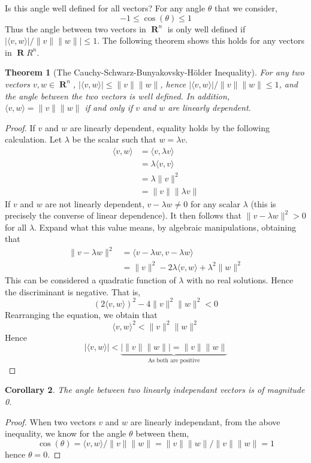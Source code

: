 \documentclass{report}
\newtheorem{theorem}{Theorem}[chapter]
\newtheorem{corollary}[theorem]{Corollary}
\DeclareMathOperator{\real}{\mathbf{R}}
\begin{document}
Is this angle well defined for all vectors? For any angle $\theta$ that we consider,
%
\[ -1 \leq \cos(\theta) \leq 1 \]
%
Thus the angle between two vectors in $\real^n$ is only well defined if $|\langle v, w \rangle|/\|v\|\|w\|| \leq 1$. The following theorem shows this holds for any vectors in $\real{R}^n$.

\begin{theorem}[The Cauchy-Schwarz-Bunyakovsky-H\"{o}lder Inequality]
  For any two vectors $v,w \in \real^n$, $|\langle v, w \rangle| \leq \|v\|\|w\|$, hence $|\langle v, w \rangle|/\|v\|\|w\| \leq 1$, and the angle between the two vectors is well defined. In addition, $\langle v, w \rangle = \|v\|\|w\|$ if and only if $v$ and $w$ are linearly dependent.
\end{theorem}
\begin{proof}
  If $v$ and $w$ are linearly dependent, equality holds by the following calculation. Let $\lambda$ be the scalar such that $w = \lambda v$.
  \begin{align*}
    \langle v, w \rangle &= \langle v, \lambda v \rangle\\
                         &= \lambda \langle v, v \rangle\\
                         &= \lambda \| v \|^2\\
                         &= \| v \| \| \lambda v \|
  \end{align*}
  If $v$ and $w$ are not linearly dependent, $v - \lambda w \neq 0$ for any scalar $\lambda$ (this is precisely the converse of linear dependence). It then follows that $\| v - \lambda w \|^2 > 0$ for all $\lambda$. Expand what this value means, by algebraic manipulations, obtaining that
  \begin{align*}
    \| v - \lambda w \|^2 &= \langle v - \lambda w, v - \lambda w \rangle\\
                          &= \|v\|^2 - 2 \lambda \langle v, w \rangle + \lambda^2 \| w \|^2
  \end{align*}
  This can be considered a quadratic function of $\lambda$ with no real solutions. Hence the discriminant is negative. That is,
  \[ (2 \langle v, w \rangle)^2 - 4 \|v\|^2 \|w\|^2 < 0 \]
  Rearranging the equation, we obtain that
  \[ \langle v, w \rangle^2 < \|v\|^2\|w\|^2 \]
  Hence
  \[ |\langle v, w \rangle| < \underbrace{|\|v\|\|w\|| = \|v\|\|w\|}_\text{As both are positive} \]
\end{proof}

\begin{corollary}
  The angle between two linearly independant vectors is of magnitude 0.
\end{corollary}
\begin{proof}
  When two vectors $v$ and $w$ are linearly independant, from the above inequality, we know for the angle $\theta$ between them,
  \[\cos(\theta) = \langle v, w \rangle/\|v\|\|w\| = \|v\|\|w\|/\|v\|\|w\| = 1\]
  hence $\theta = 0$.
\end{proof}
\end{document}
